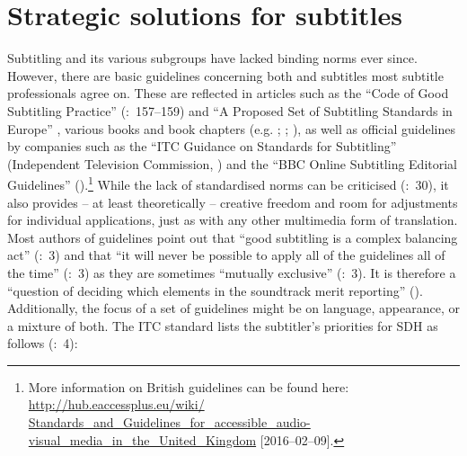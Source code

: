 \section{Strategic solutions for subtitles}\label{sec:1.2}

Subtitling and its various subgroups have lacked binding norms ever since. However, there are basic guidelines concerning both  and  subtitles most subtitle professionals agree on. These are reflected in articles such as the “Code of Good Subtitling Practice” (\citealt{Ivarsson1998}:~157--159) and “A Proposed Set of Subtitling Standards in Europe” \citep{Karamitroglou1998}, various books and book chapters (e.g. \citealt{Leisner2009}; \citealt{Diaz_cintas2007}; \citealt{Diaz_cintas2007b}), as well as official guidelines by companies such as the “ITC Guidance on Standards for Subtitling” (Independent Television Commission, \citealt{Itc1999}) and the “BBC Online Subtitling Editorial Guidelines” (\citealt{Ford_williams2009}).\footnote{More information on British guidelines can be found here: \url {http://hub.eaccessplus.eu/wiki/ Standards\_and\_Guidelines\_for\_accessible\_audio-visual\_media\_in\_the\_United\_Kingdom} [2016--02--09].} While the lack of standardised norms can be criticised (\citealt{Leisner2009}:~30), it also provides – at least theoretically – creative freedom and room for adjustments for individual applications, just as with any other multimedia form of translation. Most authors of guidelines point out that “good subtitling is a complex balancing act” (\citealt{Ford_williams2009}:~3) and that “it will never be possible to apply all of the guidelines all of the time” (\citealt{Ford_williams2009}:~3) as they are sometimes “mutually exclusive” (\citealt{Ford_williams2009}:~3). It is therefore a “question of deciding which elements in the soundtrack merit reporting” (\citealt{Eaccess+2016}). Additionally, the focus of a set of guidelines might be on language, appearance, or a mixture of both. The ITC standard lists the subtitler’s priorities for SDH as follows (\citealt{Itc1999}:~4):

